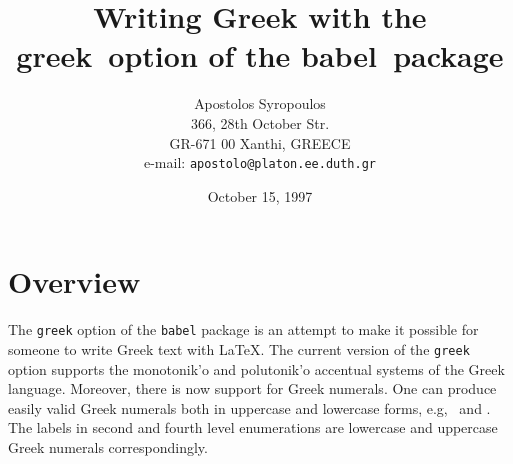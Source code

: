 \documentclass[11pt]{article}
\begin{document}
{}

\title{Writing Greek with the \ttfamily greek\rmfamily\  option of the
\ttfamily babel\rmfamily\ package}
\author{Apostolos Syropoulos\\
        366, 28th October Str.\\
        GR-671 00 Xanthi, GREECE\\
        e-mail: \texttt{apostolo@platon.ee.duth.gr}}
\date{October 15, 1997}
\maketitle



\section{Overview}

The \texttt{greek} option of the \texttt{babel} package is an attempt to
make it possible for someone to write Greek text with \LaTeX. The current
version of the \texttt{greek} option supports the
\textgreek{monotonik'o} and \textgreek{polutonik'o} 
accentual systems of the Greek language.
Moreover, there is now support for Greek numerals. One can produce easily 
valid Greek numerals both in uppercase and lowercase forms, e.g,
\textgreek{}\ and \textgreek{}. The
labels in second and fourth level enumerations are lowercase
and uppercase Greek numerals correspondingly.
\end{document}
